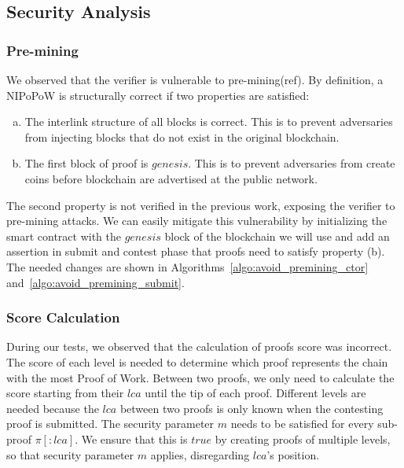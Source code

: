 \subsection{Security Analysis}

\subsubsection{Pre-mining} We observed that the verifier is vulnerable to
pre-mining(ref). By definition, a NIPoPoW is structurally correct if two
properties are satisfied:

\begin{enumerate}[(a)]

\item The interlink structure of all blocks is correct. This is to prevent
    adversaries from injecting blocks that do not exist in the original
    blockchain.

\item The first block of proof is $genesis$. This is to prevent adversaries
    from create coins before blockchain are advertised at the public network.

\end{enumerate}

The second property is not verified in the previous work, exposing the verifier
to pre-mining attacks. We can easily mitigate this vulnerability by
initializing the smart contract with the $genesis$ block of the blockchain we
will use and add an assertion in submit and contest phase that proofs need to
satisfy property (b). The needed changes are shown in
Algorithms~\ref{algo:avoid_premining_ctor}
and~\ref{algo:avoid_premining_submit}.



\subsubsection{Score Calculation}

During our tests, we observed that the calculation of proofs score was
incorrect. The score of each level is needed to determine which proof
represents the chain with the most Proof of Work. Between two proofs, we only
need to calculate the score starting from their $lca$ until the tip of each
proof. Different levels are needed because the $lca$ between two proofs is only
known when the contesting proof is submitted. The security parameter $m$ needs
to be satisfied for every sub-proof $\pi[:lca]$. We ensure that this is $true$
by creating proofs of multiple levels, so that security parameter $m$ applies,
disregarding $lca$'s position.

